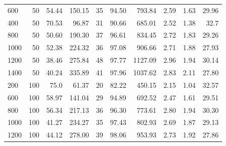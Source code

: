 \begin{table}[h]
{{\begin{tabular}{lrrrrrrrrr}
                600        & 50                   & 54.44             & 150.15          & 35       & 94.50          & 793.84                     & 2.59      & 1.63              & 29.96                    \\
                400        & 50                   & 70.53             & 96.87           & 31       & 90.66          & 685.01                     & 2.52      & 1.38              & 32.7                     \\
                800        & 50                   & 50.60             & 190.30          & 37       & 96.61          & 834.45                     & 2.72      & 1.83              & 29.26                    \\
                1000       & 50                   & 52.38             & 224.32          & 36       & 97.08          & 906.66                     & 2.71      & 1.88              & 27.93                    \\
                1200       & 50                   & 38.46             & 275.84          & 48       & 97.77          & 1127.09                    & 2.96      & 1.94              & 30.14                    \\
                1400       & 50                   & 40.24             & 335.89          & 41       & 97.96          & 1037.62                    & 2.83      & 2.11              & 27.80                    \\
                \hline
                200        & 100                  & 75.0              & 61.37           & 20       & 82.22          & 450.15                     & 2.15      & 1.04              & 32.57                    \\
                600        & 100                  & 58.97             & 141.04          & 29       & 94.89          & 692.52                     & 2.47      & 1.61              & 29.51                    \\
                800        & 100                  & 56.34             & 217.13          & 36       & 96.30          & 773.61                     & 2.80      & 1.94              & 30.30                    \\
                1000       & 100                  & 41.27             & 234.27          & 35       & 97.43          & 802.93                     & 2.69      & 1.87              & 29.13                    \\
                1200       & 100                  & 44.12             & 278.00          & 39       & 98.06          & 953.93                     & 2.73      & 1.92              & 27.86                    \\

\end{tabular}}}
\end{table}
